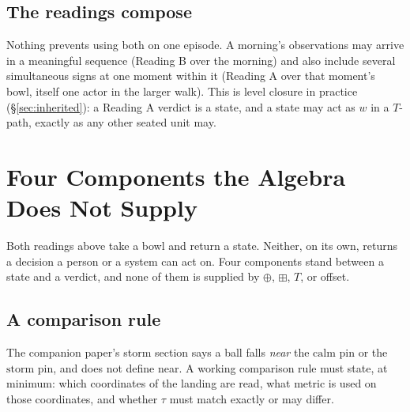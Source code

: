 \documentclass[12pt, a4paper]{article}
\begin{document}
\subsection{The readings compose}
\label{subsec:readings_compose}
Nothing prevents using both on one episode. A morning's observations
may arrive in a meaningful sequence (Reading B over the morning) and
also include several simultaneous signs at one moment within it
(Reading A over that moment's bowl, itself one actor in the larger
walk). This is level closure in practice (\S\ref{sec:inherited}): a
Reading A verdict is a state, and a state may act as $w$ in a $T$-path,
exactly as any other seated unit may.

\section{Four Components the Algebra Does Not Supply}
\label{sec:four_gaps}

Both readings above take a bowl and return a state. Neither, on its
own, returns a decision a person or a system can act on. Four
components stand between a state and a verdict, and none of them is
supplied by $\oplus$, $\boxplus$, $T$, or offset.

\subsection{A comparison rule}
\label{subsec:comparison_rule}
The companion paper's storm section says a ball falls \emph{near} the
$\mathrm{calm}$ pin or the $\mathrm{storm}$ pin, and does not define
near. A working comparison rule must state, at minimum: which
coordinates of the landing are read, what metric is used on those
coordinates, and whether $\tau$ must match exactly or may differ.
\end{document}

